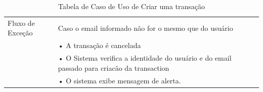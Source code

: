 \documentclass[a4paper,12pt]{article}
\begin{document}
\begin{table}[ht]
\begin{tabular}{|p{3.5cm}|p{10cm}|p{7cm}|}
        \multirow{1}{*}{Fluxo de Exceção}
                                           & Caso o email informado não for o mesmo que do usuário                                       \\
                                           & • A transação é cancelada                                                                   \\
                                           & • O Sistema verifica a identidade do usuário e do email passado para criacão da transaction \\
                                           & • O sistema exibe mensagem de alerta.                                                       \\
        \hline
    \end{tabular}
    \caption{Tabela de Caso de Uso de Criar uma transação}
\end{table}
\end{document}
